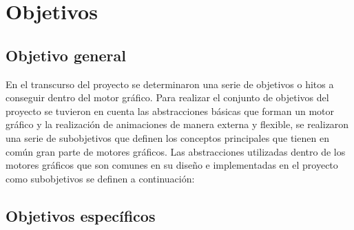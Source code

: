 \documentclass[a4paper, 17pt]{book}
\begin{document}
  


\cleardoublepage
\chapter{Objetivos}
\label{chap:objetivos}

\section{Objetivo general}
\label{sec:objetivo-general}

En el transcurso del proyecto se determinaron una serie de objetivos o hitos a conseguir dentro del motor gráfico. 
Para realizar el conjunto de objetivos del proyecto se tuvieron en cuenta las abstracciones básicas que forman
un motor gráfico y la realización de animaciones de manera externa y flexible, se realizaron una serie de
subobjetivos que definen los conceptos principales que tienen en común gran parte de motores gráficos.
Las abstracciones utilizadas dentro de los motores gráficos que son comunes en su diseño e implementadas
en el proyecto como subobjetivos se definen a continuación:

\section{Objetivos específicos}
\label{sec:objetivos-especificos}
\end{document}
